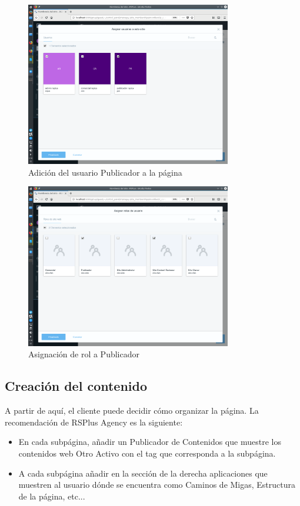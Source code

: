 \begin{figure}[H]
\begin{center}
\includegraphics[width=0.8\textwidth]{./img/liferay/24.png}
\end{center}
\caption{Adición del usuario Publicador a la página}
\label{img:lr24}
\end{figure}

\begin{figure}[H]
\begin{center}
\includegraphics[width=0.8\textwidth]{./img/liferay/25.png}
\end{center}
\caption{Asignación de rol a Publicador}
\label{img:lr25}
\end{figure}

\subsection{Creación del contenido}
A partir de aquí, el cliente puede decidir cómo organizar la página. La recomendación de RSPlus Agency es la siguiente:
\begin{itemize}[-]
    \item En cada subpágina, añadir un Publicador de Contenidos que muestre los contenidos web Otro Activo con el tag que corresponda a la subpágina.
    \item A cada subpágina añadir en la sección de la derecha aplicaciones que muestren al usuario dónde se encuentra como Caminos de Migas, Estructura de la página, etc...
\end{itemize}
